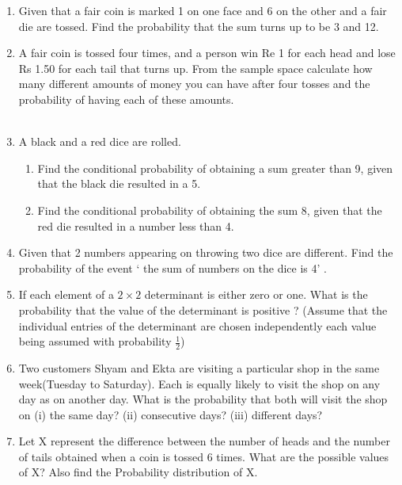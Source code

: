 \begin{enumerate}[label=\thechapter.\arabic*,ref=\thechapter.\theenumi]
	\item Given that a fair coin is marked 1 on one face and 6 on the other and a fair die are tossed. Find the probability that the sum turns up to be 3 and 12. 
		\\
		\solution
		
	\item A fair coin is tossed four times, and a person win Re 1 for each head and lose Rs 1.50 for each tail that turns up.
From the sample space calculate how many different amounts of money you can have after four tosses and the probability of having each of these amounts.\\
		\\
		\solution
		


\item A black and a red dice are rolled.
\begin{enumerate}
    \item Find the conditional probability of obtaining a sum greater than 9, given
that the black die resulted in a 5.
    \item Find the conditional probability of obtaining the sum 8, given that the red die
resulted in a number less than 4.
\end{enumerate}
		\solution
		
	\item Given that 2 numbers appearing on throwing two dice are different. Find the probability of the event ‘ the sum of numbers on the dice is 4’ .
		\\
		\solution
		
 \item If each element of a $2\times 2$ determinant is either zero or one. What is the probability that the value of the determinant is positive ? 
 (Assume that the individual entries of the determinant are chosen independently each value being assumed with probability $\frac{1}{2}$) \\
 \solution
		
\item Two customers Shyam and Ekta are visiting a particular shop in the same week(Tuesday to Saturday). Each is equally likely to visit the shop on any day as on another day. What is the probability that both will visit the shop on (i) the same day? (ii) consecutive days? (iii) different days?
\\
	
\item Let X represent the difference between the number of heads and the number of tails obtained when a coin is tossed 6 times. What are the possible values of X? Also find the Probability distribution of X.
\\
       
\end{enumerate}
 
